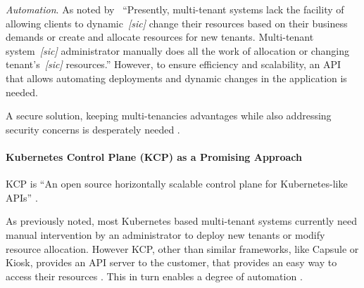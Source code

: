 \documentclass[11pt, a4paper, oneside, draft]{scrartcl}
\newcommand{\sic}{\textnormal{\textit{[sic]}}}
\begin{document}
\begin{enumerate}[label={[\arabic*]:},
                    ref=Challenge~\arabic*,
                    leftmargin=*,
                    itemsep=0.6\baselineskip]
                    \item\label{chal:automation}
                        \textit{Automation}.
                        As noted by~\cite[p.~651]{nguyen2022} \enquote{Presently, multi-tenant
                        systems lack the facility of allowing clients to dynamic~\sic{}
                        change their resources based on their business demands or create and
                        allocate resources for new tenants.
                        Multi-tenant system~\sic{} administrator manually does all the work of
                        allocation or changing tenant's~\sic{} resources.}
                        However, to ensure efficiency and scalability, an API that allows automating
                        deployments and dynamic changes in the application is needed.

                \end{enumerate}

                A secure solution, keeping multi-tenancies advantages while also addressing security
                concerns is desperately needed
                \parencites[p.~346]{aljahdali2014}[pp.~14576--14577]{senel2023}.

            \paragraph{Kubernetes Control Plane (KCP) as a Promising Approach}
                KCP is \enquote{An open source horizontally scalable control plane for
                Kubernetes-like APIs} \parencite{kcpio}.


                As previously noted, most Kubernetes based multi-tenant systems currently need
                manual intervention by an administrator to deploy new tenants or modify resource
                allocation.
                However KCP, other than similar frameworks, like Capsule or Kiosk, provides an
                API server to the customer, that provides an easy way to access
                their resources \parencites[p.~651]{nguyen2022}{kcpio}.
                This in turn enables a degree of automation \parencite[p.~651]{nguyen2022}.
\end{document}
